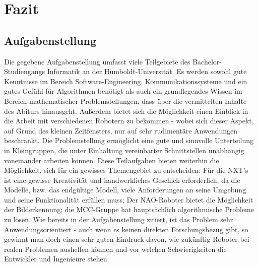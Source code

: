 \chapter{Fazit}\label{Fazit}

\section{Aufgabenstellung}
Die gegebene Aufgabenstellung umfasst viele Teilgebiete des Bachelor-Studiengangs Informatik an der Humboldt-Universität. Es werden sowohl gute Kenntnisse im Bereich Software-Engineering, Kommunikationssysteme und ein gutes Gefühl für Algorithmen benötigt als auch ein grundlegendes Wissen im Bereich mathematischer Problemstellungen, dass über die vermittelten Inhalte des Abiturs hinausgeht. Außerdem bietet sich die Möglichkeit einen Einblick in die Arbeit mit verschiedenen Robotern zu bekommen - wobei sich dieser Aspekt, auf Grund des kleinen Zeitfensters, nur auf sehr rudimentäre Anwendungen beschränkt.
Die Problemstellung ermöglicht eine gute und sinnvolle Unterteilung in Kleingruppen, die unter Einhaltung vereinbarter Schnittstellen unabhängig voneinander arbeiten können. Diese Teilaufgaben bieten weiterhin  die Möglichkeit, sich für ein gewisses Themengebiet zu entscheiden: Für die NXT's ist eine gewisse Kreativität und handwerkliches Geschick erforderlich, da die Modelle, bzw. das endgültige Modell, viele Anforderungen an seine Umgebung und seine Funktionalität erfüllen muss; Der NAO-Roboter bietet die Möglichkeit der Bilderkennung; die MCC-Gruppe hat hauptsächlich algorithmische Probleme zu lösen.
Wie bereits in der Aufgabenstellung zitiert, ist das Problem sehr Anwendungsorientiert - auch wenn es keinen direkten Forschungsbezug gibt, so gewinnt man doch einen sehr guten Eindruck davon, wie zukünftig Roboter bei realen Problemen aushelfen können und vor welchen Schwierigkeiten die Entwickler und Ingenieure stehen.

